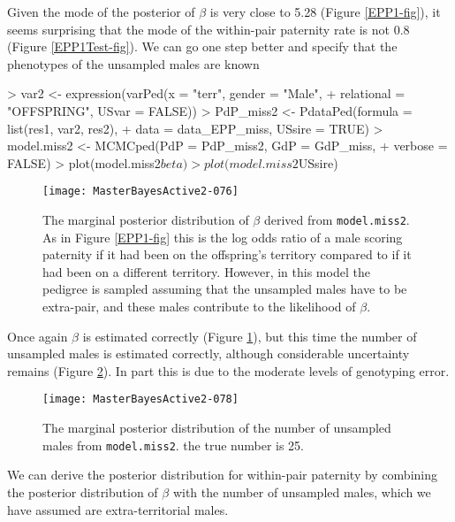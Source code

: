 \documentclass{article}
\begin{document}
Given the mode of the posterior of $\beta$ is very close to 5.28 (Figure \ref{EPP1-fig}), it seems surprising that the mode of the within-pair paternity rate is not 0.8 (Figure \ref{EPP1Test-fig}). We can go one step better and specify that the phenotypes of the unsampled males are known 

\begin{Schunk}
\begin{Sinput}
> var2 <- expression(varPed(x = "terr", gender = "Male", 
+     relational = "OFFSPRING", USvar = FALSE))
> PdP_miss2 <- PdataPed(formula = list(res1, var2, res2), 
+     data = data_EPP_miss, USsire = TRUE)
> model.miss2 <- MCMCped(PdP = PdP_miss2, GdP = GdP_miss,
+     verbose = FALSE)
> plot(model.miss2$beta)
> plot(model.miss2$USsire)
\end{Sinput}
\end{Schunk}


\begin{figure}[!h]
\begin{center}
\texttt{[image: MasterBayesActive2-076]}
\end{center}
\caption{The marginal posterior distribution of $\beta$ derived from \texttt{model.miss2}. As in Figure \ref{EPP1-fig} this is the log odds ratio of a male scoring paternity if it had been on the offspring's territory compared to if it had been on a different territory. However, in this model the pedigree is sampled assuming that the unsampled males have to be extra-pair, and these males contribute to the likelihood of $\beta$.}
\label{model.miss2-fig}
\end{figure}

Once again $\beta$ is estimated correctly (Figure \ref{model.miss2-fig}), but this time the number of unsampled males is estimated correctly, although considerable uncertainty remains (Figure \ref{model.miss2US-fig}).  In part this is due to the moderate levels of genotyping error.\\


\begin{figure}[!h]
\begin{center}
\texttt{[image: MasterBayesActive2-078]}
\end{center}
\caption{The marginal posterior distribution of the number of unsampled males from \texttt{model.miss2}.  the true number is 25.}
\label{model.miss2US-fig}
\end{figure}

We can derive the posterior distribution for within-pair paternity by combining the posterior distribution of $\beta$ with the number of unsampled males, which we have assumed are extra-territorial males.
\end{document}
